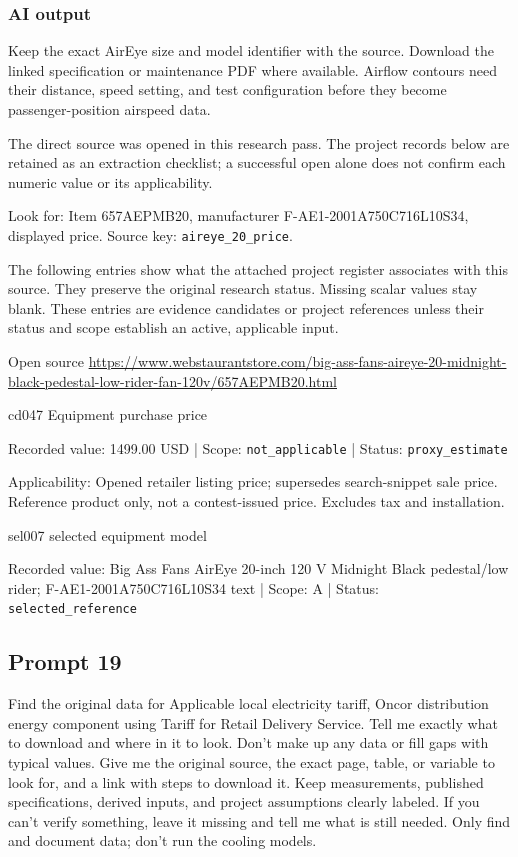\subsubsection*{AI output}
Keep the exact AirEye size and model identifier with the source. Download the linked specification or maintenance PDF where available. Airflow contours need their distance, speed setting, and test configuration before they become passenger-position airspeed data.

The direct source was opened in this research pass. The project records below are retained as an extraction checklist; a successful open alone does not confirm each numeric value or its applicability.

Look for: Item 657AEPMB20, manufacturer F-AE1-2001A750C716L10S34, displayed price. Source key: \nolinkurl{aireye_20_price}.

The following entries show what the attached project register associates with this source. They preserve the original research status. Missing scalar values stay blank. These entries are evidence candidates or project references unless their status and scope establish an active, applicable input.

Open source  \url{https://www.webstaurantstore.com/big-ass-fans-aireye-20-midnight-black-pedestal-low-rider-fan-120v/657AEPMB20.html}

cd047  Equipment purchase price

Recorded value: 1499.00 USD | Scope: \nolinkurl{not_applicable} | Status: \nolinkurl{proxy_estimate}

Applicability: Opened retailer listing price; supersedes search-snippet sale price. Reference product only, not a contest-issued price. Excludes tax and installation.

sel007  selected equipment model

Recorded value: Big Ass Fans AirEye 20-inch 120 V Midnight Black pedestal/low rider; F-AE1-2001A750C716L10S34 text | Scope: A | Status: \nolinkurl{selected_reference}

\subsection*{Prompt 19}
Find the original data for Applicable local electricity tariff, Oncor distribution energy component using Tariff for Retail Delivery Service. Tell me exactly what to download and where in it to look. Don’t make up any data or fill gaps with typical values. Give me the original source, the exact page, table, or variable to look for, and a link with steps to download it. Keep measurements, published specifications, derived inputs, and project assumptions clearly labeled. If you can’t verify something, leave it missing and tell me what is still needed. Only find and document data; don’t run the cooling models.

